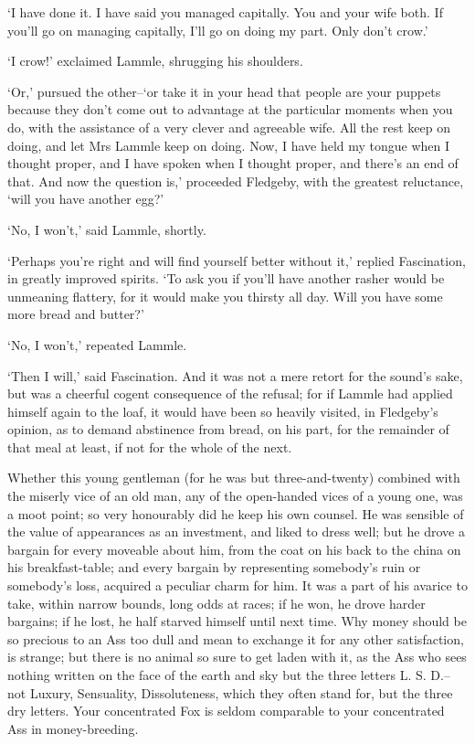 ‘I have done it. I have said you managed capitally. You and your wife
both. If you’ll go on managing capitally, I’ll go on doing my part. Only
don’t crow.’

‘I crow!’ exclaimed Lammle, shrugging his shoulders.

‘Or,’ pursued the other--‘or take it in your head that people are your
puppets because they don’t come out to advantage at the particular
moments when you do, with the assistance of a very clever and agreeable
wife. All the rest keep on doing, and let Mrs Lammle keep on doing. Now,
I have held my tongue when I thought proper, and I have spoken when I
thought proper, and there’s an end of that. And now the question is,’
proceeded Fledgeby, with the greatest reluctance, ‘will you have another
egg?’

‘No, I won’t,’ said Lammle, shortly.

‘Perhaps you’re right and will find yourself better without it,’ replied
Fascination, in greatly improved spirits. ‘To ask you if you’ll have
another rasher would be unmeaning flattery, for it would make you
thirsty all day. Will you have some more bread and butter?’

‘No, I won’t,’ repeated Lammle.

‘Then I will,’ said Fascination. And it was not a mere retort for the
sound’s sake, but was a cheerful cogent consequence of the refusal; for
if Lammle had applied himself again to the loaf, it would have been so
heavily visited, in Fledgeby’s opinion, as to demand abstinence from
bread, on his part, for the remainder of that meal at least, if not for
the whole of the next.

Whether this young gentleman (for he was but three-and-twenty) combined
with the miserly vice of an old man, any of the open-handed vices of
a young one, was a moot point; so very honourably did he keep his own
counsel. He was sensible of the value of appearances as an investment,
and liked to dress well; but he drove a bargain for every moveable about
him, from the coat on his back to the china on his breakfast-table;
and every bargain by representing somebody’s ruin or somebody’s loss,
acquired a peculiar charm for him. It was a part of his avarice to take,
within narrow bounds, long odds at races; if he won, he drove harder
bargains; if he lost, he half starved himself until next time. Why money
should be so precious to an Ass too dull and mean to exchange it for any
other satisfaction, is strange; but there is no animal so sure to get
laden with it, as the Ass who sees nothing written on the face of the
earth and sky but the three letters L. S. D.--not Luxury, Sensuality,
Dissoluteness, which they often stand for, but the three dry letters.
Your concentrated Fox is seldom comparable to your concentrated Ass in
money-breeding.

